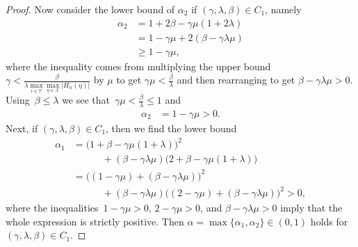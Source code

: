 \documentclass[9pt,shortpaper,twoside,web]{ieeecolor}
\newcommand{\X}{\ensuremath{\mathcal{X}}\xspace}
\newcommand{\V}{\ensuremath{\mathcal{V}}\xspace}
\begin{document}
\begin{proof}
    Now consider the lower bound of $\alpha_2$ if $(\gamma,\lambda,\beta)\in C_1$, namely
    \begin{align}
        \alpha_2 &= 1 + 2\beta-\gamma\mu(1+2\lambda)
        \\&= 1 -\gamma\mu + 2(\beta-\gamma\lambda\mu)
        \\ &\geq 1-\gamma\mu,
    \end{align}
    where the inequality comes from multiplying the upper bound $\gamma< \frac{\beta}{\lambda\max\limits_{i\in\V}\max\limits_{\eta\in\X}\vert H_{ii}(\eta)\vert}$ by $\mu$ 
    to get $\gamma\mu< \frac{\beta}{\lambda}$ and then rearranging to get $\beta-\gamma\lambda\mu>0$.
    Using~$\beta \leq \lambda$ we see that~$\gamma\mu < \frac{\beta}{\lambda} \leq 1$ and 
    \begin{align}
        \alpha_2 &= 1-\gamma\mu>0.
    \end{align}
    Next, if $(\gamma,\lambda,\beta)\in C_1$, then we find the lower bound
    \begin{align}
        \alpha_1 &=\big(1 + \beta -\gamma\mu(1+\lambda)\big)^2 
        \\ &\quad\quad\quad + (\beta - \gamma\lambda\mu)\big(2+\beta-\gamma\mu(1+\lambda)\big)
        \\ &=\big((1-\gamma\mu) + (\beta-\gamma\lambda\mu)\big)^2
        \\ &\quad\quad\quad + (\beta-\gamma\lambda\mu)\big((2 -\gamma\mu) + (\beta-\gamma\lambda\mu)\big)^2
        >0,
    \end{align}
    where the inequalities~$1 - \gamma\mu > 0$, $2 - \gamma\mu > 0$, and
    $\beta - \gamma\lambda\mu > 0$ imply that the whole expression is strictly positive. 
    Then $\alpha=\max\{\alpha_1,\alpha_2\}\in (0,1)$ holds for $(\gamma,\lambda,\beta)\in C_1$.
      

\end{proof}
\end{document}

